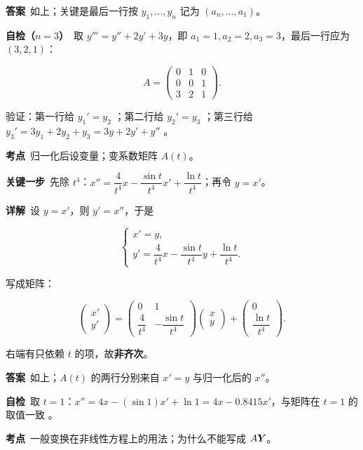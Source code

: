 \documentclass[11pt]{ctexart}
\renewcommand{\qbreak}{\needspace{0.26\textheight}}
\newcommand{\qpagebreak}{\needspace{0.92\textheight}}
\newcommand{\mat}[1]{\begin{pmatrix}#1\end{pmatrix}}
\begin{document}
\textbf{答案}\ 如上；关键是最后一行按 $y_1,\dots,y_n$ 记为 $(a_n,\dots,a_1)$。

\textbf{自检（$n=3$）}\ 取 $y'''=y''+2y'+3y$，即 $a_1=1,a_2=2,a_3=3$，最后一行应为 $(3,2,1)$：

\[
A=\mat{0&1&0\\0&0&1\\3&2&1}.
\]

验证：第一行给 $y_1'=y_2$ ；第二行给 $y_2'=y_3$ ；第三行给 $y_3'=3y_1+2y_2+y_3=3y+2y'+y''$ 。

\qpagebreak
{}
\label{c1:app:a7}

\qbreak
{}

\textbf{考点}\ 归一化后设变量；变系数矩阵 $A(t)$。

\textbf{关键一步}\ 先除 $t^4$：$x''=\dfrac{4}{t^4}x-\dfrac{\sin t}{t^4}x'+\dfrac{\ln t}{t^4}$；再令 $y=x'$。

\textbf{详解}\ 设 $y=x'$，则 $y'=x''$，于是

\[
\begin{cases}
x'=y,\\[3pt]
y'=\dfrac{4}{t^4}x-\dfrac{\sin t}{t^4}y+\dfrac{\ln t}{t^4}.
\end{cases}
\]

写成矩阵：

\[
\mat{x'\\ y'}=\mat{0&1\\[2pt] \dfrac{4}{t^4}&-\dfrac{\sin t}{t^4}}\mat{x\\ y}+\mat{0\\[2pt]\dfrac{\ln t}{t^4}}.
\]

右端有只依赖 $t$ 的项，故\textbf{非齐次}。

\textbf{答案}\ 如上；$A(t)$ 的两行分别来自 $x'=y$ 与归一化后的 $x''$。

\textbf{自检}\ 取 $t=1$：$x''=4x-(\sin1)x'+\ln1=4x-0.8415x'$，与矩阵在 $t=1$ 的取值一致 。

\qpagebreak
{}
\label{c1:app:a8}

\qbreak
{}

\textbf{考点}\ 一般变换在非线性方程上的用法；为什么不能写成 $A\boldsymbol{Y}$。
\end{document}
